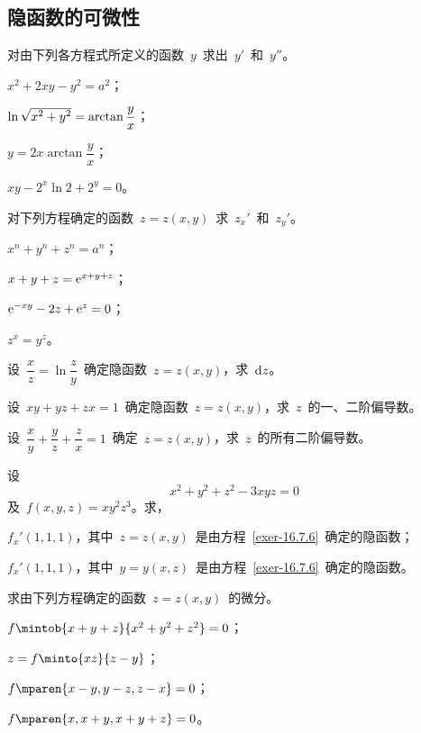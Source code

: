 \subsection{隐函数的可微性}
\begin{exercise}
\item 对由下列各方程式所定义的函数~$y$~求出~$y'$~和~$y''$。
\begin{exlistcols}
  \item $x^2+2xy-y^2=a^2$；
  \item $\ln\smbsqrt{x^2+y^2}=\arctan\dfrac yx$；
  \item $y=2x\arctan\dfrac yx$；
  \item $xy-2^x\ln 2+2^y=0$。
\end{exlistcols}
\item 对下列方程确定的函数~$z=z(x,y)$~求~$z_x'$~和~$z_y'$。
\begin{exlistcols}[4]
  \item $x^n+y^n+z^n=a^n$；
  \item $x+y+z=\mathrm e^{x+y+z}$；
  \item $\mathrm e^{-xy}-2z+\mathrm e^z=0$；
  \item $z^x=y^z$。
\end{exlistcols}
\item 设~$\dfrac xz=\ln\dfrac zy$~确定隐函数~$z=z(x,y)$，求~$\mathop{}\negthinspace\mathrm d z$。
\item 设~$xy+yz+zx=1$~确定隐函数~$z=z(x,y)$，求~$z$~的一、二阶偏导数。
\item 设~$\dfrac xy+\dfrac yz+\dfrac zx=1$~确定~$z=z(x,y)$，求~$z$~的所有二阶偏导数。
\item 设
\begin{equation}\label{exer-16.7.6}
  x^2+y^2+z^2-3xyz=0\tag*{($\ast$)}
\end{equation}
及~$f(x,y,z)=xy^2z^3$。求，
\begin{exlist}
  \item $f_x'(1,1,1)$，其中~$z=z(x,y)$~是由方程~\ref{exer-16.7.6}~确定的隐函数；
  \item $f_x'(1,1,1)$，其中~$y=y(x,z)$~是由方程~\ref{exer-16.7.6}~确定的隐函数。
\end{exlist}
\item 求由下列方程确定的函数~$z=z(x,y)$~的微分。
\begin{exlistcols}
  \item $f\mintob{x+y+z}{x^2+y^2+z^2}=0$；
  \item $z=f\minto{xz}{z-y}$；
  \item $f\mparen{x-y,y-z,z-x}=0$；
  \item $f\mparen{x,x+y,x+y+z}=0$。

\end{exlistcols}
\end{exercise}
